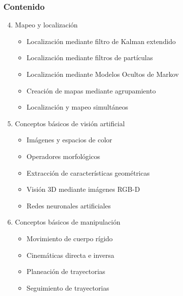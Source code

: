 \begin{frame}\frametitle{Contenido}
  \begin{enumerate}
    \setcounter{enumi}{3}
  \item Mapeo y localización
    \begin{itemize}
    \item Localización mediante filtro de Kalman extendido
    \item Localización mediante filtros de partículas
    \item Localización mediante Modelos Ocultos de Markov
    \item Creación de mapas mediante agrupamiento
    \item Localización y mapeo simultáneos
    \end{itemize}
  \item Conceptos básicos de visión artificial
    \begin{itemize}
    \item Imágenes y espacios de color
    \item Operadores morfológicos
    \item Extracción de características geométricas
    \item Visión 3D mediante imágenes RGB-D
    \item Redes neuronales artificiales
    \end{itemize}
  \item Conceptos básicos de manipulación
    \begin{itemize}
    \item Movimiento de cuerpo rígido
    \item Cinemáticas directa e inversa
    \item Planeación de trayectorias
    \item Seguimiento de trayectorias
    \end{itemize}
  \end{enumerate}
\end{frame}

